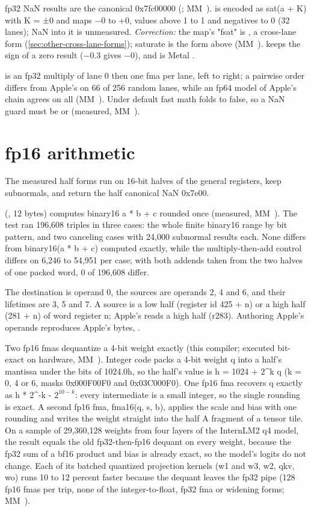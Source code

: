 fp32 NaN results are the canonical 0x7fc00000 (; MM~). 
is encoded as sat(a + K) with K = ±0 and maps −0 to +0, values above 1 to 1 and negatives to 0 (32 lanes); NaN into it is
unmeasured. \emph{Correction:} the map's "fsat" is , a cross-lane form (\cref{sec:other-cross-lane-forms});
saturate is the form above (MM~).  keeps the sign of a zero result (−0.3 gives −0), and  is Metal .

 is an fp32 multiply of lane 0 then one fma per lane, left to right; a
pairwise order differs from Apple's on 66 of 256 random lanes, while an fp64 model of Apple's chain agrees on all (MM~).
Under default fast math  folds to false, so a NaN guard must be  or
 (measured, MM~).

\section{fp16 arithmetic}\label{sec:fp16-arithmetic}

The measured half forms run on 16-bit halves of the general registers, keep subnormals, and return the half canonical
NaN 0x7e00.

 (, 12 bytes) computes binary16 a * b + c rounded once (measured,
MM~). The test ran 196,608 triples in three cases: the whole finite binary16 range by bit pattern, and two
canceling cases with 24,000 subnormal results each. None differs from binary16(a * b + c) computed exactly, while the
multiply-then-add control differs on 6,246 to 54,951 per case; with both addends taken from the two halves of one packed
word, 0 of 196,608 differ.

The destination is operand 0, the sources are operands 2, 4 and 6, and their lifetimes are 3, 5 and 7. A source is a low
half (register id 425 + n) or a high half (281 + n) of word register n; Apple's  reads a high
half (r283). Authoring Apple's operands reproduces Apple's bytes, .

Two fp16 fmas dequantize a 4-bit weight exactly (this compiler; executed bit-exact on hardware,
MM~). Integer code packs a 4-bit weight q into a half's mantissa under the bits of 1024.0h, so the half's value is
h = 1024 + 2\^{}k q (k = 0, 4 or 6, masks 0x000F00F0 and 0x03C000F0). One fp16 fma recovers q exactly as h * 2\^{}-k - $2^{10-k}$:
every intermediate is a small integer, so the single rounding is exact. A second fp16 fma, fma16(q, s, b), applies the
scale and bias with one rounding and writes the weight straight into the half A fragment of a tensor tile. On a sample
of 29,360,128 weights from four layers of the InternLM2 q4 model, the result equals the old fp32-then-fp16 dequant on
every weight, because the fp32 sum of a bf16 product and bias is already exact, so the model's logits do not change. Each
of its batched quantized projection kernels (w1 and w3, w2, qkv, wo) runs 10 to 12 percent faster because the dequant
leaves the fp32 pipe (128 fp16 fmas per trip, none of the integer-to-float, fp32 fma or widening forms; MM~).

